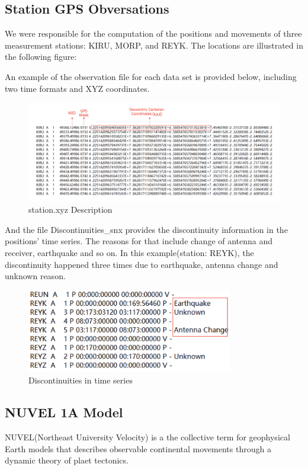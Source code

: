 \documentclass{article}
\begin{document}
\subsection{Station GPS Obversations}
We were responsible for the computation of the positions and movements of three measurement stations: KIRU, MORP, and REYK. The locations are illustrated in the following figure:

An example of the observation file for each data set is provided below, including two time formats and XYZ coordinates.
\begin{figure}[htbp]
    \centering
    \includegraphics[width=12cm]{./source/xyz.png}
    \caption{station.xyz Description}
    \label{fig:XYZ_obs}
\end{figure}

And the file Discontinuities\_snx provides the discontinuity information in the positions' time series. The reasons for that include change of antenna and receiver, earthquake and so on.
In this example(station: REYK), the discontinuity happened three times due to earthquake, antenna change and unknown reason.
\begin{figure}[htbp]
  \centering
  \includegraphics[width=9cm]{../source/dis.png}
  \caption{Discontinuities in time series}
  \label{fig:Dis_snx}
\end{figure}

\subsection{NUVEL 1A Model}
NUVEL(Northeast University Velocity) is a the collective term for geophysical Earth models that describes observable
continental movements through a dynamic theory of plaet tectonics.
\end{document}
